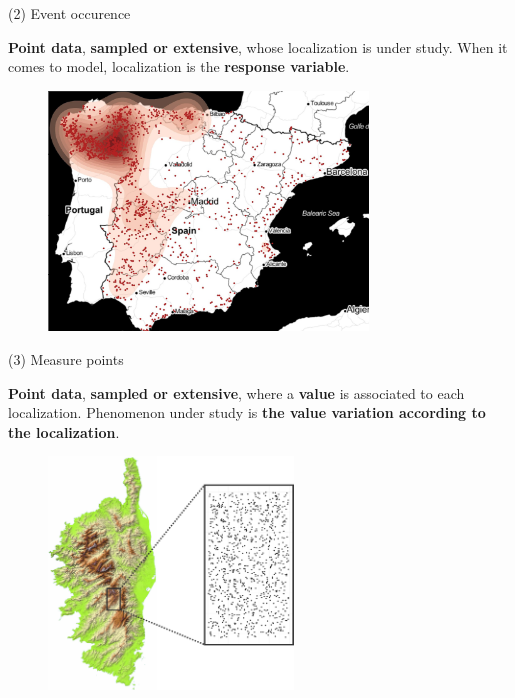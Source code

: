 \begin{frame}{(2) Event occurence}

 \textbf{Point data}, \textbf{sampled or extensive}, whose localization is under study. 
When it comes to model, localization is  the \textbf{response variable}.

\begin{figure}
  \includegraphics[width=8.5cm]{Incendies.jpg}
\end{figure}

\end{frame}


\begin{frame}{(3) Measure points}

 \textbf{Point data}, \textbf{sampled or extensive}, where a \textbf{value} is associated to each localization.  Phenomenon under study is \textbf{the value variation according to the localization}.

\begin{figure}
  \includegraphics[width=6.5cm]{Corse.pdf}
\end{figure}

\end{frame}


